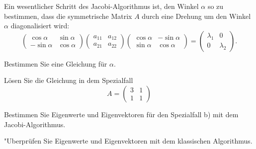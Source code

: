 Ein wesentlicher Schritt des Jacobi-Algorithmus ist, den Winkel
$\alpha$ so zu bestimmen, dass die symmetrische Matrix $A$ durch eine Drehung
um den Winkel $\alpha$ diagonalisiert wird:
\[
\begin{pmatrix}
 \cos\alpha&\sin\alpha\\
-\sin\alpha&\cos\alpha
\end{pmatrix}
\begin{pmatrix}
a_{11}&a_{12}\\
a_{21}&a_{22}
\end{pmatrix}
\begin{pmatrix}
 \cos\alpha&-\sin\alpha\\
 \sin\alpha& \cos\alpha
\end{pmatrix}
=
\begin{pmatrix}
\lambda_1&0\\
0&\lambda_2
\end{pmatrix}.
\]
\begin{teilaufgaben}
\item Bestimmen Sie eine Gleichung für $\alpha$.
\item Lösen Sie die Gleichung in dem Spezialfall
\[
A=\begin{pmatrix}
3&1\\
1&1
\end{pmatrix}
\]
\item Bestimmen Sie Eigenwerte und Eigenvektoren für den
Spezialfall b) mit dem Jacobi-Algorithmus.
\item "Uberprüfen Sie Eigenwerte und Eigenvektoren mit dem klassischen
Algorithmus.
\end{teilaufgaben}

